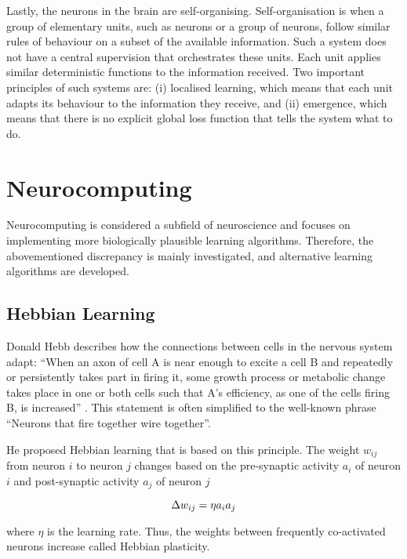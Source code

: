 Lastly, the neurons in the brain are self-organising.
Self-organisation is when a group of elementary units, such as neurons or a group of neurons, follow similar rules of behaviour on a subset of the available information.
Such a system does not have a central supervision that orchestrates these units.
Each unit applies similar deterministic functions to the information received.
Two important principles of such systems are: (i) localised learning, which means that each unit adapts its behaviour to the information they receive, and (ii) emergence, which means that there is no explicit global loss function that tells the system what to do.


\section{Neurocomputing}
Neurocomputing is considered a subfield of neuroscience and focuses on implementing more biologically plausible learning algorithms. Therefore, the abovementioned discrepancy is mainly investigated, and alternative learning algorithms are developed.

\subsection{Hebbian Learning}
Donald Hebb describes how the connections between cells in the nervous system adapt: ``When an axon of cell A is near enough to excite a cell B and repeatedly or persistently takes part in firing it, some growth process or metabolic change takes place in one or both cells such that A's efficiency, as one of the cells firing B, is increased'' . This statement is often simplified to the well-known phrase ``Neurons that fire together wire together''.

He proposed Hebbian learning that is based on this principle.
The weight $w_{ij}$ from neuron $i$ to neuron $j$ changes based on the pre-synaptic activity $a_i$ of neuron $i$ and post-synaptic activity $a_j$ of neuron $j$

\begin{equation}\eqlbl{hebb_1}
	\Delta w_{ij} = \eta a_i a_j
\end{equation}

where \(\eta\) is the learning rate.
Thus, the weights between frequently co-activated neurons increase called Hebbian plasticity.

